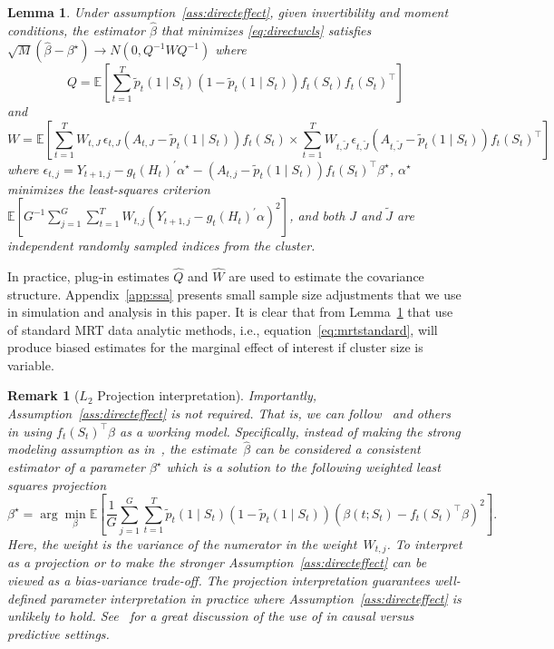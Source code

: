 \documentclass[12pt]{article}
\newtheorem{lemma}[thm]{Lemma}
\newtheorem{remark}[thm]{Remark}%
\newcommand{\zw}[1]{\textcolor{blue}{[\textit{ZW: #1}]}}
\begin{document}
\begin{lemma}
\label{lemma:asymnorm}
Under assumption~\ref{ass:directeffect}, given invertibility and moment conditions, the estimator $\hat \beta$ that minimizes \eqref{eq:directwcls} satisfies $\sqrt{M} \left(\hat \beta - \beta^\star \right) \to N(0, Q^{-1} W Q^{-1})$ where
$$
Q = \mathbb{E} \left[ \sum_{t=1}^T \tilde p_t( 1 \mid S_{t} ) ( 1- \tilde p_t( 1 \mid S_{t} )) f_t (S_t) f_t (S_t)^\top \right]
$$
and
$$
W =  \mathbb{E} \left[ \sum_{t=1}^T W_{t,J} \, \epsilon_{t,J} ( A_{t,J} - \tilde p_t( 1 \mid S_{t} )) f_t (S_t) \times \sum_{t=1}^T W_{t, \tilde J} \, \epsilon_{t, \tilde J} ( A_{t, \tilde J} - \tilde p_t( 1 \mid S_{t} )) f_t (S_t)^\top  \right]
$$
where $\epsilon_{t,j} = Y_{t+1, j} - g_t(H_t)^\prime \alpha^\star - (A_{t,j} - \tilde p_t (1 \mid S_t) ) f_t (S_t)^\top \beta^\star$, $\alpha^\star$ minimizes the least-squares criterion $\mathbb{E}  \left[G^{-1} \sum_{j=1}^G \sum_{t=1}^T W_{t,j} \left( Y_{t+1,j} - g_t(H_t)^\prime \alpha \right)^2 \right]$, and both $J$ and $\tilde J$ are independent randomly sampled indices from the cluster.
\end{lemma}

\noindent In practice, plug-in estimates $\hat Q$ and $\hat W$ are used to estimate the covariance structure. Appendix~\ref{app:ssa} presents small sample size adjustments that we use in simulation and analysis in this paper.  It is clear that from Lemma~\ref{lemma:asymnorm} that use of standard MRT data analytic methods, i.e., equation~\eqref{eq:mrtstandard}, will produce biased estimates for the marginal effect of interest if cluster size is variable.

\begin{remark}[$L_2$ Projection interpretation]
\label{rmk:l2proj}
\normalfont
Importantly, Assumption~\ref{ass:directeffect} is not required.  That is, we can follow~\cite{Neugebauer2007,Rosenblum2010,Kennedy2019,DempseyAOAS} and others in using $f_t (S_t)^\top \beta$ as a working model.  Specifically, instead of making the strong modeling assumption as in~\cite{Boruvkaetal}, the estimate~$\hat \beta$ can be considered a consistent estimator of a parameter $\beta^\star$ which is a solution to the following weighted least squares projection
$$
\beta^\star = \arg \min_{\beta} \mathbb{E} \left[ \frac{1}{G} \sum_{j=1}^G \sum_{t=1}^T \tilde p_t(1 \mid S_t) \left( 1 - \tilde p_t(1 \mid S_t) \right) \left( \beta(t; S_t) - f_t (S_t)^\top \beta \right)^2 \right].
$$
Here, the weight is the variance of the numerator in the weight~$W_{t,j}$.  To interpret as a projection or to make the stronger Assumption~\ref{ass:directeffect} can be viewed as a bias-variance trade-off.  The projection interpretation guarantees well-defined parameter interpretation in practice where Assumption~\ref{ass:directeffect} is unlikely to hold.  See~\cite[Sec. 3.1, pp.9--10]{Kennedy2019} for a great discussion of the use of in causal versus predictive settings.
\end{remark}
\end{document}
